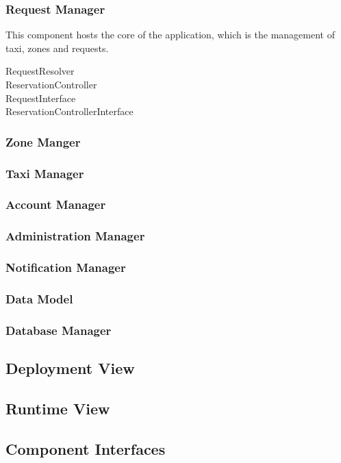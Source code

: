 \documentclass[11pt, a4paper,titlepage]{article}
\begin{document}
 \subsubsection{Request Manager}
	 This component hosts the core of the application, which is the management of taxi, zones and requests.
	  \begin{description}
	  	\item[RequestResolver]
	  	\item[ReservationController]
	  	\item[RequestInterface]
	  	\item[ReservationControllerInterface]
	  \end{description}
 \subsubsection{Zone Manger}
 \subsubsection{Taxi Manager}
 \subsubsection{Account Manager}
 \subsubsection{Administration Manager}
 \subsubsection{Notification Manager}
 \subsubsection{Data Model}
 \subsubsection{Database Manager}
 
	
\subsection{Deployment View}
\subsection{Runtime View}
\subsection{Component Interfaces}
\end{document}
